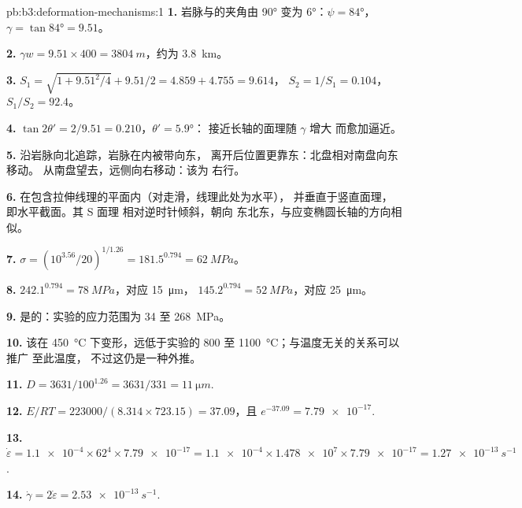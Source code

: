 \begin{solution}{pb:b3:deformation-mechanisms:1}
\textbf{1.} 岩脉与的夹角由 \ang{90} 变为 \ang{6}：$\psi =
\ang{84}$，$\gamma = \tan\ang{84} = 9.51$。

\textbf{2.} $\gamma w = 9.51\times400 = \qty{3804}{m}$，约为 \qty{3.8}{km}。

\textbf{3.} $S_1 = \sqrt{1 + 9.51^2/4} + 9.51/2 = 4.859 + 4.755 = 9.614$，
$S_2 = 1/S_1 = 0.104$，$S_1/S_2 = 92.4$。

\textbf{4.} $\tan2\theta' = 2/9.51 = 0.210$，$\theta' = \ang{5.9}$：
接近长轴的面理随 $\gamma$ 增大
而愈加逼近。

\textbf{5.} 沿岩脉向北追踪，岩脉在内被带向东，
离开后位置更靠东：北盘相对南盘向东移动。
从南盘望去，远侧向右移动：该为
右行。

\textbf{6.} 在包含拉伸线理的平面内（对走滑，线理此处为水平），
并垂直于竖直面理，即水平截面。其 S 面理
相对逆时针倾斜，朝向
东北东，与应变椭圆长轴的方向相似。

\textbf{7.} $\sigma = (10^{3.56}/20)^{1/1.26} = 181.5^{0.794} = \qty{62}{MPa}$。

\textbf{8.} $242.1^{0.794} = \qty{78}{MPa}$，对应 \qty{15}{\micro m}，
$145.2^{0.794} = \qty{52}{MPa}$，对应 \qty{25}{\micro m}。

\textbf{9.} 是的：实验的应力范围为 34 至 \qty{268}{MPa}。

\textbf{10.} 该在 \qty{450}{\celsius} 下变形，远低于实验的 800 至
\qty{1100}{\celsius}；与温度无关的关系可以推广
至此温度，
不过这仍是一种外推。

\textbf{11.} $D = 3631/100^{1.26} = 3631/331 = \qty{11}{\micro m}$.

\textbf{12.} $E/RT = 223000/(8.314\times723.15) = 37.09$，且 $e^{-37.09} =
\num{7.79e-17}$.

\textbf{13.} $\dot\varepsilon = \num{1.1e-4}\times62^4\times\num{7.79e-17} =
\num{1.1e-4}\times\num{1.478e7}\times\num{7.79e-17} = \qty{1.27e-13}{s^{-1}}$.

\textbf{14.} $\dot\gamma = 2\dot\varepsilon = \qty{2.53e-13}{s^{-1}}$.


\end{solution}
